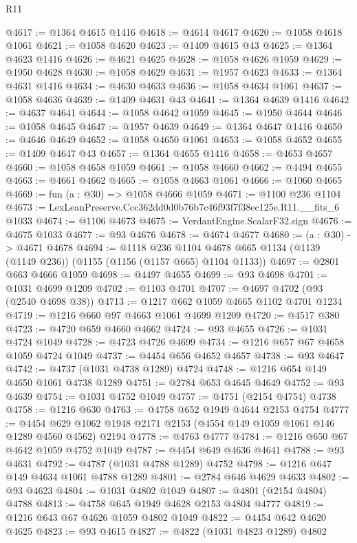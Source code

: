 \begin{lexlean}{R11}
\begin{coremodule}
@4617 := @1364 @4615 @1416
@4618 := @4614 @4617
@4620 := @1058 @4618 @1061
@4621 := @1058 @4620
@4623 := @1409 @4615 @43
@4625 := @1364 @4623 @1416
@4626 := @4621 @4625
@4628 := @1058 @4626 @1059
@4629 := @1950 @4628
@4630 := @1058 @4629
@4631 := @1957 @4623
@4633 := @1364 @4631 @1416
@4634 := @4630 @4633
@4636 := @1058 @4634 @1061
@4637 := @1058 @4636
@4639 := @1409 @4631 @43
@4641 := @1364 @4639 @1416
@4642 := @4637 @4641
@4644 := @1058 @4642 @1059
@4645 := @1950 @4644
@4646 := @1058 @4645
@4647 := @1957 @4639
@4649 := @1364 @4647 @1416
@4650 := @4646 @4649
@4652 := @1058 @4650 @1061
@4653 := @1058 @4652
@4655 := @1409 @4647 @43
@4657 := @1364 @4655 @1416
@4658 := @4653 @4657
@4660 := @1058 @4658 @1059
@4661 := @1058 @4660
@4662 := @4494 @4655
@4663 := @4661 @4662
@4665 := @1058 @4663 @1061
@4666 := @1060 @4665
@4669 := fun (a : @30) => @1058 @4666 @1059
@4671 := @1100 @236 @1104
@4673 := LexLeanPreserve.Ccc362dd0d0b76b7c46f93f7f38ec125e.R11.__fits_6 @1033
@4674 := @1106 @4673
@4675 := VerdantEngine.ScalarF32.sign
@4676 := @4675 @1033
@4677 := @93 @4676
@4678 := @4674 @4677
@4680 := (a : @30) -> @4671 @4678
@4694 := @1118
    @236
    @1104
    @4678
    @665
    @1134
    (@1139 (@1149 @236))
    (@1155 (@1156 (@1157 @665) @1104 @1133))
@4697 := @2801 @663 @4666 @1059
@4698 := @4497 @4655
@4699 := @93 @4698
@4701 := @1031 @4699 @1209
@4702 := @1103 @4701
@4707 := @4697 @4702 (@93 (@2540 @4698 @38))
@4713 := @1217 @662 @1059 @4665 @1102 @4701 @1234
@4719 := @1216 @660 @97 @4663 @1061 @4699 @1209
@4720 := @4517 @380
@4723 := @4720 @659 @4660 @4662
@4724 := @93 @4655
@4726 := @1031 @4724 @1049
@4728 := @4723 @4726 @4699
@4734 := @1216 @657 @67 @4658 @1059 @4724 @1049
@4737 := @4454 @656 @4652 @4657
@4738 := @93 @4647
@4742 := @4737 (@1031 @4738 @1289) @4724
@4748 := @1216 @654 @149 @4650 @1061 @4738 @1289
@4751 := @2784 @653 @4645 @4649
@4752 := @93 @4639
@4754 := @1031 @4752 @1049
@4757 := @4751 (@2154 @4754) @4738
@4758 := @1216 @630
@4763 := @4758 @652 @1949 @4644 @2153 @4754
@4777 := @4454 @629 @1062 @1948 @2171 @2153 (@4554 @149 @1059 @1061 @146 @1289 @4560 @4562) @2194
@4778 := @4763 @4777
@4784 := @1216 @650 @67 @4642 @1059 @4752 @1049
@4787 := @4454 @649 @4636 @4641
@4788 := @93 @4631
@4792 := @4787 (@1031 @4788 @1289) @4752
@4798 := @1216 @647 @149 @4634 @1061 @4788 @1289
@4801 := @2784 @646 @4629 @4633
@4802 := @93 @4623
@4804 := @1031 @4802 @1049
@4807 := @4801 (@2154 @4804) @4788
@4813 := @4758 @645 @1949 @4628 @2153 @4804 @4777
@4819 := @1216 @643 @67 @4626 @1059 @4802 @1049
@4822 := @4454 @642 @4620 @4625
@4823 := @93 @4615
@4827 := @4822 (@1031 @4823 @1289) @4802

\end{coremodule}
\end{lexlean}
